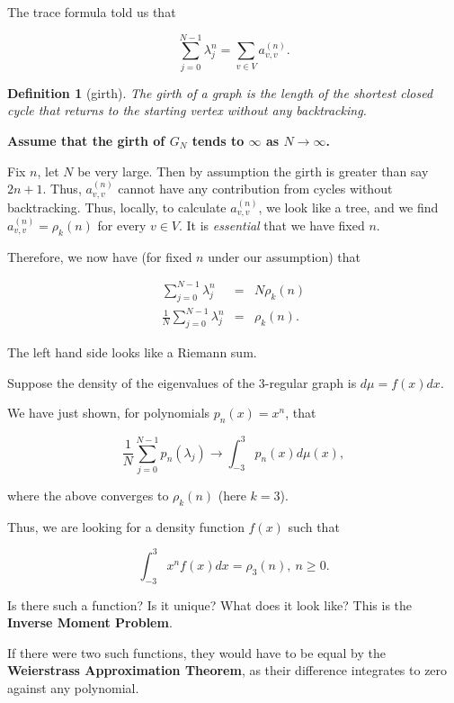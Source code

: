 \documentclass[12pt,letterpaper]{report}
\newcommand\be{\begin{equation}}
\newcommand\ee{\end{equation}}
\newcommand\bea{\begin{eqnarray}}
\newcommand\eea{\end{eqnarray}}
\newcommand{\tbf}[1]{\textbf{#1}}
\newtheorem{defi}[thm]{Definition}
\begin{document}
The trace formula told us that

\be \sum_{j=0}^{N-1} \lambda_j^n = \sum_{v \in V} a^{(n)}_{v,v}.
\ee

\begin{defi}[girth] The girth of a graph is the length of the
shortest closed cycle that returns to the starting vertex without
any backtracking. \end{defi}


\tbf{Assume that the girth of $G_N$ tends to $\infty$ as $N \to
\infty$. }

Fix $n$, let $N$ be very large. Then by assumption the girth is
greater than say $2n+1$. Thus, $a^{(n)}_{v,v}$ cannot have any
contribution from cycles without backtracking. Thus, locally, to
calculate $a^{(n)}_{v,v}$, we look like a tree, and we find
$a^{(n)}_{v,v} = \rho_k(n)$ for every $v \in V$. It is
\emph{essential} that we have fixed $n$.

Therefore, we now have (for fixed $n$ under our assumption) that

\bea \sum_{j=0}^{N-1} \lambda_j^n &=& N \rho_k(n) \nonumber\\
\frac{1}{N} \sum_{j=0}^{N-1} \lambda_j^n &=& \rho_k(n). \eea

The left hand side looks like a Riemann sum.

Suppose the density of the eigenvalues of the $3$-regular graph is
$d\mu = f(x)dx$.

We have just shown, for polynomials $p_n(x) = x^n$, that

\be \frac{1}{N} \sum_{j=0}^{N-1} p_n(\lambda_j) \to \int_{-3}^3
p_n(x) d\mu(x), \ee

where the above converges to $\rho_k(n)$ (here $k = 3$).

Thus, we are looking for a density function $f(x)$ such that

\be \int_{-3}^3 x^n f(x) dx = \rho_3(n), \ n \ge 0. \ee

Is there such a function? Is it unique? What does it look like?
This is the \tbf{Inverse Moment Problem}.

If there were two such functions, they would have to be equal by
the \tbf{Weierstrass Approximation Theorem}, as their difference
integrates to zero against any polynomial.
\end{document}
